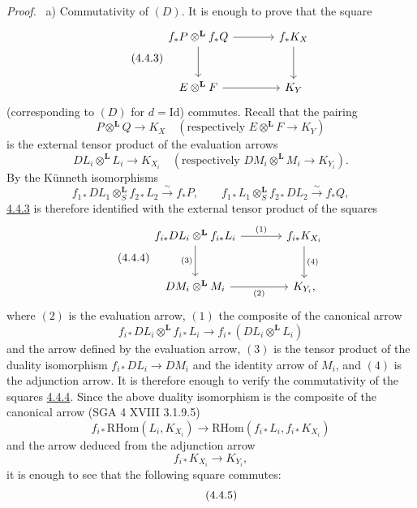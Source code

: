 \documentclass[11pt]{article}
\newenvironment{prooftext}[1][Proof]{\par\noindent\emph{#1.}\ }{\par\medskip}
\providecommand{\RHom}{\mathrm{RHom}}
\providecommand{\Id}{\mathrm{Id}}
\providecommand{\lisom}{\xrightarrow{\sim}}
\providecommand{\RHom}{\mathrm{RHom}}
\providecommand{\RHom}{\mathrm R\mathcal{H}om}
\providecommand{\RHom}{\mathrm{RHom}}
\begin{document}
\begin{prooftext}[Proof]
a) Commutativity of $(D)$. It is enough to prove that the square
\begin{equation}
\tag{4.4.3}\label{sga5:III:equation:4.4.3}
\begin{tikzcd}[column sep=large,row sep=large]
f_*P\otimes^{\mathbf L}f_*Q \arrow[r] \arrow[d] & f_*K_X \arrow[d]\\
E\otimes^{\mathbf L}F \arrow[r] & K_Y
\end{tikzcd}
\end{equation}
(corresponding to $(D)$ for $d=\Id$) commutes. Recall that the pairing
\[
P\otimes^{\mathbf L}Q\longrightarrow K_X
\quad(\text{respectively }E\otimes^{\mathbf L}F\longrightarrow K_Y)
\]
is the external tensor product of the evaluation arrows
\[
DL_i\otimes^{\mathbf L}L_i\longrightarrow K_{X_i}
\quad(\text{respectively }DM_i\otimes^{\mathbf L}M_i\longrightarrow K_{Y_i}).
\]
By the Künneth isomorphisms
\[
f_{1*}DL_1\otimes_S^{\mathbf L} f_{2*}L_2 \lisom f_*P,\qquad
f_{1*}L_1\otimes_S^{\mathbf L} f_{2*}DL_2 \lisom f_*Q,
\]
\hyperref[sga5:III:equation:4.4.3]{4.4.3} is therefore identified with the external tensor product of the squares
\begin{equation}
\tag{4.4.4}\label{sga5:III:equation:4.4.4}
\begin{tikzcd}[column sep=large,row sep=large]
f_{i*}DL_i\otimes^{\mathbf L} f_{i*}L_i
 \arrow[r,"(1)"] \arrow[d,"(3)"'] &
f_{i*}K_{X_i} \arrow[d,"(4)"]\\
DM_i\otimes^{\mathbf L}M_i \arrow[r,"(2)"'] & K_{Y_i},
\end{tikzcd}
\end{equation}
where $(2)$ is the evaluation arrow, $(1)$ the composite of the canonical arrow
\[
f_{i*}DL_i\otimes^{\mathbf L} f_{i*}L_i\longrightarrow f_{i*}(DL_i\otimes^{\mathbf L}L_i)
\]
and the arrow defined by the evaluation arrow, $(3)$ is the tensor product of the duality isomorphism $f_{i*}DL_i\longrightarrow DM_i$ and the identity arrow of $M_i$, and $(4)$ is the adjunction arrow. It is therefore enough to verify the commutativity of the squares \hyperref[sga5:III:equation:4.4.4]{4.4.4}. Since the above duality isomorphism is the composite of the canonical arrow (SGA 4 XVIII 3.1.9.5)
\[
f_{i*}\RHom(L_i,K_{X_i})\longrightarrow \RHom(f_{i*}L_i,f_{i*}K_{X_i})
\]
and the arrow deduced from the adjunction arrow
\[
f_{i*}K_{X_i}\longrightarrow K_{Y_i},
\]
it is enough to see that the following square commutes:
\begin{equation}
\tag{4.4.5}\label{sga5:III:equation:4.4.5}
\begin{tikzcd}[column sep=large,row sep=large]

\end{tikzcd}
\end{equation}
\end{prooftext}
\end{document}
